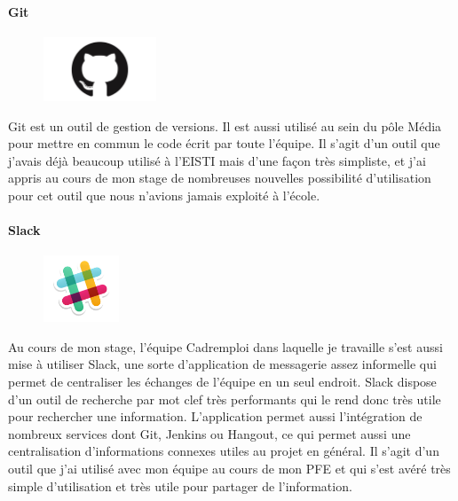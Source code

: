 \paragraph{Git}
\label{par:Git}
\begin{figure}
  \begin{center}
    \includegraphics[width=0.30\textwidth]{Pictures/git_logo.jpg}
  \end{center}
\end{figure}
Git est un outil de gestion de versions.
Il est aussi utilisé au sein du pôle Média pour mettre en commun le code écrit par toute l'équipe.
Il s'agit d'un outil que j'avais déjà beaucoup utilisé à l'EISTI mais d'une façon très simpliste, et j'ai appris au cours de mon stage de nombreuses nouvelles possibilité d'utilisation pour cet outil que nous n'avions jamais exploité à l'école.
\paragraph{Slack}
\label{par:Slack}
\begin{figure}
  \begin{center}
    \includegraphics[width=0.20\textwidth]{Pictures/slack_logo.png}
  \end{center}
\end{figure}
Au cours de mon stage, l'équipe Cadremploi dans laquelle je travaille s'est aussi mise à utiliser Slack, une sorte d'application de messagerie assez informelle qui permet de centraliser les échanges de l'équipe en un seul endroit.
Slack dispose d'un outil de recherche par mot clef très performants qui le rend donc très utile pour rechercher une information.
L'application permet aussi l'intégration de nombreux services dont Git, Jenkins ou Hangout, ce qui permet aussi une centralisation d'informations connexes utiles au projet en général.
Il s'agit d'un outil que j'ai utilisé avec mon équipe au cours de mon PFE et qui s'est avéré très simple d'utilisation et très utile pour partager de l'information.


